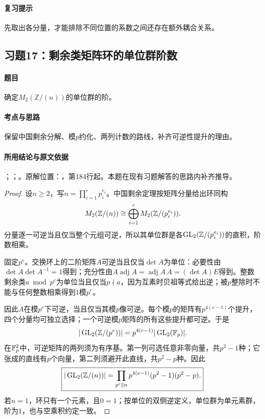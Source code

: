 \paragraph{复习提示}

先取出各分量，才能排除不同位置的系数之间还存在额外耦合关系。



\subsection{习题17：剩余类矩阵环的单位群阶数}

\label{ex:3:17}

\paragraph{题目}

确定$M_2(\mathbb Z/(n))$的单位群的阶。

\paragraph{考点与思路}

保留中国剩余分解、模$p$约化、两列计数的路线，补齐可逆性提升的理由。

\paragraph{所用结论与原文依据}

；；。原解位置：，第184行起。本题在现有习题解答的思路内补齐推导。


\begin{proof}

设$n\ge2$，写$n=\prod_{i=1}^r p_i^{e_i}$。中国剩余定理按矩阵分量给出环同构
\[
M_2(\mathbb Z/(n))\cong\bigoplus\limits_{i=1}^r M_2(\mathbb Z/(p_i^{e_i})).
\]
分量逐一可逆当且仅当整个元组可逆，所以其单位群是各$\operatorname{GL}_2(\mathbb Z/(p_i^{e_i}))$的直积，阶数相乘。

固定$p^e$。交换环上的二阶矩阵$A$可逆当且仅当$\det A$为单位：必要性由$\det A\det A^{-1}=1$得到；充分性由$A\operatorname{adj}A=\operatorname{adj}A\,A=(\det A)E$得到。整数剩余类$a\bmod p^e$为单位当且仅当$p\nmid a$，因为互素时贝祖等式给出逆；被$p$整除时不能与任何整数相乘得到$1$模$p^e$。

因此$A$在模$p^e$下可逆，当且仅当其模$p$像可逆。每个模$p$的矩阵有$p^{4(e-1)}$个提升，四个分量均可独立选择；一个可逆模$p$矩阵的所有这些提升都可逆。于是
\[
|\operatorname{GL}_2(\mathbb Z/(p^e))|=p^{4(e-1)}|\operatorname{GL}_2(\mathbb F_p)|.
\]
在$\mathbb F_p^2$中，可逆矩阵的两列须为有序基。第一列可选任意非零向量，共$p^2-1$种；它张成的直线有$p$个向量，第二列须避开此直线，共$p^2-p$种。因此
\[
\boxed{|\operatorname{GL}_2(\mathbb Z/(n))|=\prod_{p^e\parallel n}p^{4(e-1)}(p^2-1)(p^2-p).}
\]
若$n=1$，环只有一个元素，且$0=1$；按单位的双侧逆定义，单位群为单元素群，阶为$1$，也与空乘积约定一致。

\end{proof}

